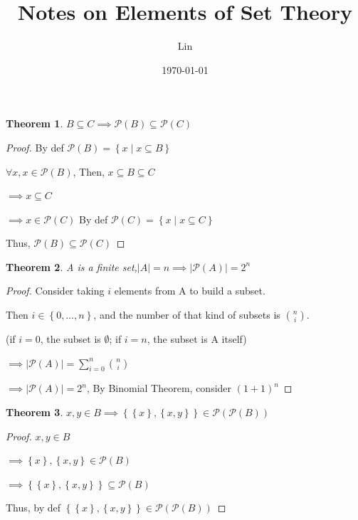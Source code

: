 \documentclass[12pt, a4paper, oneside]{article}
\title{\textbf{Notes on Elements of Set Theory}}
\author{Lin}
\date{\today}
\begin{document}
    \maketitle
    \newpage
    \theoremstyle{plain}
    \newtheorem*{remark}{Remark}
    \newtheorem{theorem}{Theorem}
    \theoremstyle{definition}
    \newtheorem{axiom}{Axiom}
    \newtheorem{definition}{Definition}
    
    \begin{theorem}
        $B\subseteq C \implies \mathscr{P}(B) \subseteq \mathscr{P}(C) $
    \end{theorem}
    
    \begin{proof}
        By def $\mathscr{P}(B) = \left\{ x \mid x \subseteq B \right\}$

        $\forall x, x \in \mathscr{P}(B)$, Then, $x \subseteq B \subseteq C$

        $\implies x \subseteq C$
    
        $\implies x \in \mathscr{P}(C)$ By def $\mathscr{P} (C) = \left\{ x \mid x \subseteq C \right\}$

        Thus, $\mathscr{P}(B) \subseteq \mathscr{P}(C)$
    \end{proof}

    \begin{theorem}
        A is a finite set,$|A|=n \implies |\mathscr{P}(A)| = 2^n$
    \end{theorem}
    
    \begin{proof}
        Consider taking $i$ elements from A to build a subset.

        Then $i \in \left\{ 0, \dots, n\right\}$, and the number of that kind of subsets is $\binom{n}{i}$.

        (if $i = 0$, the subset is $\emptyset$; if $i = n$, the subset is A itself)

        $\implies |\mathscr{P}(A)| = \sum_{i = 0}^{n}\binom{n}{i}$

        $\implies |\mathscr{P}(A)| = 2^n$, By Binomial Theorem, consider $(1+1)^n$
    \end{proof}

    \begin{theorem}
        $x, y \in B \implies \left\{ \left\{ x\right\},\left\{x, y\right\} \right\} 
        \in \mathscr{P}(\mathscr{P}(B))$
    \end{theorem}
    
    \begin{proof}
        $x, y \in B$

        $\implies \left\{x\right\}, \left\{ x, y\right\} \in \mathscr{P}(B)$

        $\implies \left\{\left\{x\right\}, \left\{x, y\right\}\right\} \subseteq \mathscr{P}(B)$

        Thus, by def $\left\{\left\{x\right\}, \left\{x, y\right\}\right\} \in \mathscr{P}(\mathscr{P}(B))$
    \end{proof}
\end{document}
